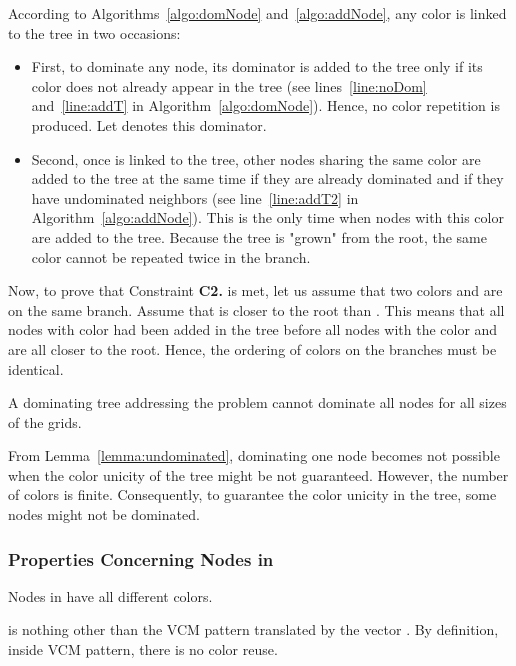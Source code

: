 \proof
According to Algorithms~\ref{algo:domNode} and~\ref{algo:addNode}, any color is linked to the tree in two occasions:
\begin{itemize}
\item First, to dominate any node, its dominator is added to the tree only if its color does not already appear in the tree (see lines~\ref{line:noDom} and~\ref{line:addT} in Algorithm~\ref{algo:domNode}). Hence, no color repetition is produced. Let  denotes this dominator.
\item Second, once  is linked to the tree, other nodes sharing the same color are added to the tree at the same time if they are already dominated and if they have undominated neighbors (see line~\ref{line:addT2} in Algorithm~\ref{algo:addNode}). 
This is the only time when nodes with this color are added to the tree. Because the tree is "grown" from the root, the same color cannot be repeated twice in the branch.
\end{itemize}
Now, to prove that Constraint \textbf{C2.} is met, let us assume that two colors  and  are on the same branch. Assume that  is closer to the root than . This means that all nodes with color  had been added in the tree before all nodes with the color  and are all closer to the root. Hence, the ordering of colors on the branches must be identical.
\endproof

\begin{theorem}\label{theo:cannotDom}
A dominating tree addressing the  problem cannot dominate all nodes for all sizes of the grids.
\end{theorem}

\proof
From Lemma~\ref{lemma:undominated}, dominating one node becomes not possible when the color unicity of the tree might be not guaranteed. However, the number of colors is finite. Consequently, to guarantee the color unicity in the tree, some nodes might not be dominated. 
\endproof

\subsubsection{Properties Concerning Nodes in }


\begin{lemma}\label{lemma:diffColors}
Nodes in  have all different colors.
\end{lemma}

\proof
 is nothing other than the VCM pattern translated by the vector . By definition, inside VCM pattern, there is no color reuse.
\endproof

